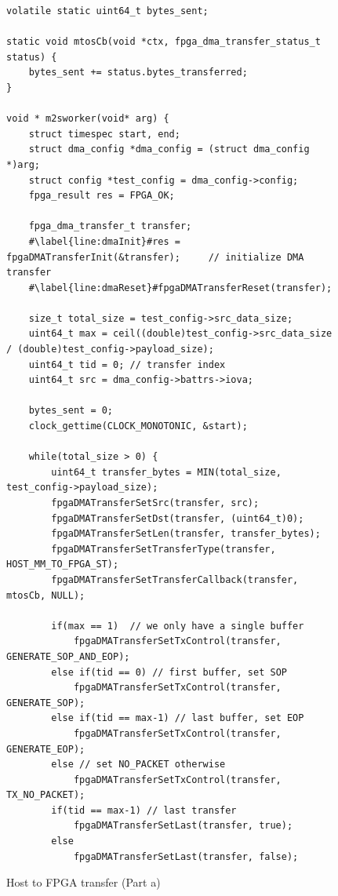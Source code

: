 \documentclass[11pt, twoside, pdftex]{article}
\begin{document}
 \lstset{language=C,numbers=left,escapechar=\#}
\begin{figure}[H]
\begin{center}
\begin{minipage}[h]{17.5 cm}
\begin{lstlisting}[name=m2sworker]
volatile static uint64_t bytes_sent;

static void mtosCb(void *ctx, fpga_dma_transfer_status_t status) {
	bytes_sent += status.bytes_transferred;
}

void * m2sworker(void* arg) {
	struct timespec start, end;
	struct dma_config *dma_config = (struct dma_config *)arg;
	struct config *test_config = dma_config->config;
	fpga_result res = FPGA_OK;

	fpga_dma_transfer_t transfer;
	#\label{line:dmaInit}#res = fpgaDMATransferInit(&transfer); 	// initialize DMA transfer
	#\label{line:dmaReset}#fpgaDMATransferReset(transfer);

	size_t total_size = test_config->src_data_size;
	uint64_t max = ceil((double)test_config->src_data_size / (double)test_config->payload_size);
	uint64_t tid = 0; // transfer index
	uint64_t src = dma_config->battrs->iova;
	
	bytes_sent = 0;
	clock_gettime(CLOCK_MONOTONIC, &start);	
	
	while(total_size > 0) {
		uint64_t transfer_bytes = MIN(total_size, test_config->payload_size);
		fpgaDMATransferSetSrc(transfer, src);
		fpgaDMATransferSetDst(transfer, (uint64_t)0);
		fpgaDMATransferSetLen(transfer, transfer_bytes);
		fpgaDMATransferSetTransferType(transfer, HOST_MM_TO_FPGA_ST);
		fpgaDMATransferSetTransferCallback(transfer, mtosCb, NULL);

		if(max == 1)  // we only have a single buffer
			fpgaDMATransferSetTxControl(transfer, GENERATE_SOP_AND_EOP);
		else if(tid == 0) // first buffer, set SOP
			fpgaDMATransferSetTxControl(transfer, GENERATE_SOP);
		else if(tid == max-1) // last buffer, set EOP
			fpgaDMATransferSetTxControl(transfer, GENERATE_EOP);
		else // set NO_PACKET otherwise
			fpgaDMATransferSetTxControl(transfer, TX_NO_PACKET);
		if(tid == max-1) // last transfer
			fpgaDMATransferSetLast(transfer, true);
		else 
			fpgaDMATransferSetLast(transfer, false);
\end{lstlisting}
\end{minipage}
\caption{Host to FPGA transfer (Part a)}
\label{fig:m2sworker}
\end{center}
\end{figure}
\end{document}
